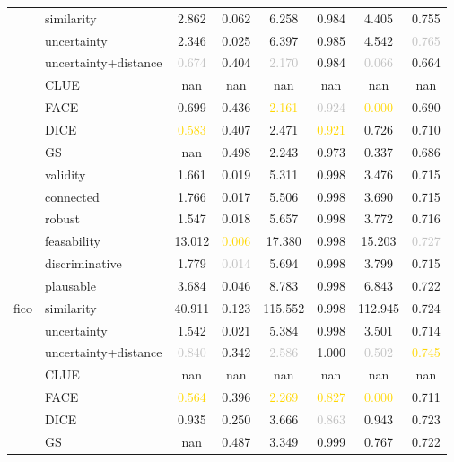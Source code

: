 \begin{table}[ht]
\begin{tabular}{l l c c c c c c}
 & similarity & 2.862 & 0.062 & 6.258 & 0.984 & 4.405 & 0.755 \\
 & uncertainty & 2.346 & 0.025 & 6.397 & 0.985 & 4.542 & \textcolor{silver}{0.765} \\
 & uncertainty+distance & \textcolor{silver}{0.674} & 0.404 & \textcolor{silver}{2.170} & 0.984 & \textcolor{silver}{0.066} & 0.664 \\
 & CLUE & nan & nan & nan & nan & nan & nan \\
 & FACE & \textcolor{bronze}{0.699} & 0.436 & \textcolor{gold}{2.161} & \textcolor{silver}{0.924} & \textcolor{gold}{0.000} & 0.690 \\
 & DICE & \textcolor{gold}{0.583} & 0.407 & 2.471 & \textcolor{gold}{0.921} & 0.726 & 0.710 \\
 & GS & nan & 0.498 & \textcolor{bronze}{2.243} & \textcolor{bronze}{0.973} & \textcolor{bronze}{0.337} & 0.686 \\
\hline
\multirow{13}{*}{fico} & validity & 1.661 & 0.019 & 5.311 & 0.998 & 3.476 & 0.715 \\
 & connected & 1.766 & \textcolor{bronze}{0.017} & 5.506 & 0.998 & 3.690 & 0.715 \\
 & robust & 1.547 & 0.018 & 5.657 & 0.998 & 3.772 & 0.716 \\
 & feasability & 13.012 & \textcolor{gold}{0.006} & 17.380 & 0.998 & 15.203 & \textcolor{silver}{0.727} \\
 & discriminative & 1.779 & \textcolor{silver}{0.014} & 5.694 & 0.998 & 3.799 & 0.715 \\
 & plausable & 3.684 & 0.046 & 8.783 & 0.998 & 6.843 & 0.722 \\
 & similarity & 40.911 & 0.123 & 115.552 & \textcolor{bronze}{0.998} & 112.945 & \textcolor{bronze}{0.724} \\
 & uncertainty & 1.542 & 0.021 & 5.384 & 0.998 & 3.501 & 0.714 \\
 & uncertainty+distance & \textcolor{silver}{0.840} & 0.342 & \textcolor{silver}{2.586} & 1.000 & \textcolor{silver}{0.502} & \textcolor{gold}{0.745} \\
 & CLUE & nan & nan & nan & nan & nan & nan \\
 & FACE & \textcolor{gold}{0.564} & 0.396 & \textcolor{gold}{2.269} & \textcolor{gold}{0.827} & \textcolor{gold}{0.000} & 0.711 \\
 & DICE & \textcolor{bronze}{0.935} & 0.250 & 3.666 & \textcolor{silver}{0.863} & 0.943 & 0.723 \\
 & GS & nan & 0.487 & \textcolor{bronze}{3.349} & 0.999 & \textcolor{bronze}{0.767} & 0.722 \\

\end{tabular}
\end{table}
